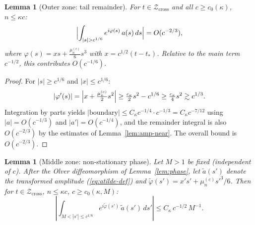 \documentclass[12pt,a4paper]{amsart}
\newtheorem{lemma}[theorem]{Lemma}
\theoremstyle{definition}
\theoremstyle{remark}
\newcommand{\Zcross}{\mathcal{Z}_{\mathrm{cross}}}
\newcommand{\tstar}{t_*}
\begin{document}
\begin{lemma}[Outer zone: tail remainder]
\label{lem:remainder}
For $t \in \Zcross$ and all $c \ge c_0(\kappa)$,
$n \le \kappa c$:
\[
  \Bigl|\int_{|s| > c^{1/6}}
  e^{i\varphi(s)}\,a(s)\,ds\Bigr|
  = O(c^{-2/3}),
\]
where $\varphi(s) = xs + \tfrac{\mu_n^{(c)}}{6}s^3$
with $x = c^{1/2}(t - \tstar)$.
Relative to the main term $c^{-1/2}$,
this contributes $O(c^{-1/6})$.
\end{lemma}

\begin{proof}
For $|s| \ge c^{1/6}$ and $|x| \le c^{1/6}$:
\[
  |\varphi'(s)| = \Bigl|x + \tfrac{\mu_n^{(c)}}{2}s^2\Bigr|
  \ge \tfrac{c_\kappa}{2}s^2 - c^{1/6}
  \ge \tfrac{c_\kappa}{4}s^2
  \gtrsim c^{1/3}.
\]
Integration by parts yields
$|\text{boundary}| \le C_\kappa c^{-1/4}\cdot c^{-1/3}
= C_\kappa c^{-7/12}$
using $|a| = O(c^{-1/3})$ and $|a'| = O(c^{-1/4})$,
and the remainder integral is also $O(c^{-2/3})$
by the estimates of Lemma~\ref{lem:amp-near}.
The overall bound is $O(c^{-2/3})$.
\end{proof}

\begin{lemma}[Middle zone: non-stationary phase]
\label{lem:intermediate}
Let $M > 1$ be fixed \textup{(}independent of $c$\textup{)}.
After the Olver diffeomorphism of
Lemma~\textup{\ref{lem:phase}},
let $\tilde{a}(s')$ denote the transformed amplitude
\textup{(\eqref{eq:atilde-def})}
and $\tilde\varphi(s') = x's' + \mu_n^{(c)}s'^3/6$.
Then for $t \in \Zcross$, $n \le \kappa c$,
$c \ge c_0(\kappa, M)$:
\[
  \left|\int_{M < |s'| \le c^{1/6}}
  e^{i\tilde\varphi(s')}\,\tilde{a}(s')\,ds'\right|
  \le C_\kappa\,c^{-1/2}\,M^{-1}.
\]
\end{lemma}
\end{document}
